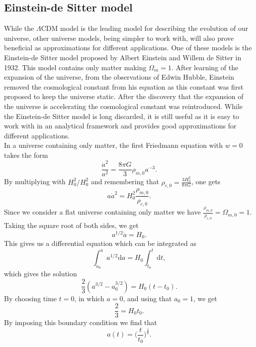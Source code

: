 \subsection{Einstein-de Sitter model}
While the $\Lambda$CDM model is the leading model for describing the evolution
of our universe, other universe models, being simpler to work with, will also
prove beneficial as approximations for different applications. One of
these models is the Einstein-de Sitter model \cite{1932PNAS...18..213E} proposed
by Albert Einstein and Willem de Sitter in 1932. This model contains only matter
making $\Omega_m=1$. After learning of the expansion
of the universe, from the observations of Edwin Hubble, Einstein removed the
cosmological constant from his equation as this constant was first proposed to keep the
universe static. After the discovery that the expansion of the universe is
accelerating \cite{Goldhaber_2009}\cite{Filippenko_1998} the cosmological
constant was reintroduced. While the Einstein-de Sitter model is long discarded, it is
still useful as it is easy to work with in an analytical framework and provides
good approximations for different applications.\\\indent
In a universe containing only
matter, the first Friedmann equation with $w=0$ takes the form
\begin{equation}
    \frac{\dot{a}^2}{a^2} = \frac{8\pi G}{3}\rho_{m,0}a^{-3}.
\end{equation}
By multiplying with $H_0^2/H_0^2$ and remembering that $\rho_{c,0}=\frac{3H_0^2}{8\pi
G}$, one gets
\begin{equation}
    a\dot{a}^2=H_0^2\frac{\rho_{m,0}}{\rho_{c,0}}.
\end{equation}
Since we consider a flat universe containing only matter we have
$\frac{\rho_{m,0}}{\rho_{c,0}}=\Omega_{m,0}=1$. Taking the square root of both
sides, we get
\begin{equation}
    a^{1/2}\dot{a}=H_0.
\end{equation}
This gives us a differential equation which can be integrated as
\begin{equation}
    \int_{a_0}^a a^{1/2}\mathrm{d}a=H_0\int_{t_0}^t \mathrm{d}t,
\end{equation}
which gives the solution
\begin{equation}
    \frac{2}{3}(a^{3/2}-a_0^{3/2})=H_0(t-t_0).
\end{equation}
By choosing time $t=0$, in which $a=0$, and using that $a_0=1$, we get
\begin{equation}
    \frac{2}{3}=H_0t_0.
\end{equation}
By imposing this boundary condition we find that
\begin{equation}
    a(t)=\Big(\frac{t}{t_0}\Big)^\frac{2}{3}.
\end{equation}

